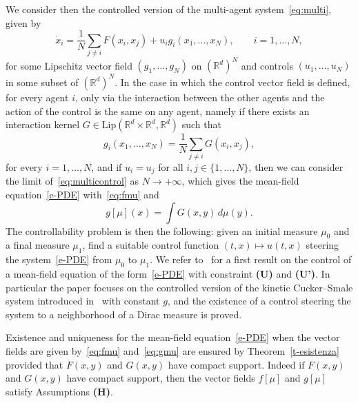 \documentclass{article}
\newcommand{\R}{\mathbb{R}}
\theoremstyle{definition}\newtheorem{remark}{Remark}
\newcommand{\Lip}{\mathrm{Lip}}
\begin{document}
We consider then the controlled version of the multi-agent system~\eqref{eq:multi}, given by
\begin{equation}\label{eq:multicontrol}
 \dot x_i  = \frac{1}{N} \sum_{j\neq i } F(x_i,x_j) + u_i g_i(x_1,\ldots,x_N), \qquad i=1,\ldots,N,
\end{equation}
for some Lipschitz vector field $(g_1,\ldots,g_N)$ on $(\R^d)^N$ and controls $(u_1,\ldots,u_N)$ in some subset of $(\R^d)^N$.
In the case in which the control vector field is defined, for every agent $i$, only via the interaction between the other agents and the action of the control is the same on any agent, namely if there exists an interaction kernel  $G \in \Lip(\R^d \times \R^d,\R^d)$ such that
$$
g_i(x_1,\ldots,x_N)= \frac{1}{N} \sum_{j\neq i } G(x_i,x_j) , 
$$
for every $i =1,\ldots, N$, and if $u_i=u_j$ for all $i,j \in \{1,\ldots, N\}$, then we can consider the limit of~\eqref{eq:multicontrol} as $N\to +\infty$, which gives the mean-field equation~\eqref{e-PDE} with~\eqref{eq:fmu} and
\begin{equation}\label{eq:gmu}
 g[\mu](x) = \int G(x,y) \, d\mu(y).
\end{equation}
The controllability problem is then the following: given an initial measure $\mu_0$ and a final measure $\mu_1$, find a suitable control function $(t,x) \mapsto u(t,x)$ steering the system~\eqref{e-PDE} from $\mu_0$ to $\mu_1$. 
We refer to~\cite{controlKCS} for a first result on the control of a mean-field equation of the form~\eqref{e-PDE} with constraint {\bf (U)} and {\bf (U')}.  In particular the paper focuses on the controlled version of the kinetic Cucker--Smale system introduced in~\cite{ha-tad} with constant $g$, and the existence of a control steering the system to a neighborhood of a Dirac measure is proved. 

Existence and uniqueness for the mean-field equation~\eqref{e-PDE} when the vector fields are given by~\eqref{eq:fmu} and~\eqref{eq:gmu} are ensured by Theorem~\ref{t-esistenza} provided that $F(x,y)$ and $G(x,y)$ have compact support. Indeed if $F(x,y)$ and $G(x,y)$ have compact support, then the vector fields $f[\mu]$ and $g[\mu]$ satisfy Assumptions {\bf (H)}.
\end{document}
